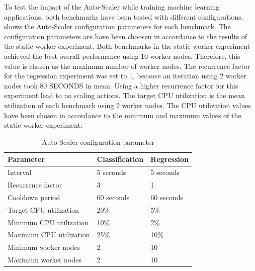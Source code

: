 To test the impact of the Auto-Scaler while training machine learning applications, both benchmarks have been tested with different configurations.  shows the Auto-Scaler configuration parameters for each benchmark.
The configuration parameters are have been choosen in accordance to the results of the static worker experiment.
Both benchmarks in the static worker experiment achieved the best overall performance using 10 worker nodes. Therefore, this value is chosen as the maximum number of worker nodes.
The recurrence factor for the regression experiment was set to 1, because an iteration using 2 worker nodes took 80 SECONDS in mean. Using a higher recurrence factor for this experiment lead to no scaling actions. The target CPU utilization is the mean utilization of each benchmark using 2 worker nodes.
The CPU utilization values have been chosen in accordance to the minimum and maximum values of the static worker experiment.
\begin{table}[]
\centering
\begin{tabular}{@{}l|ll@{}}
\toprule
Parameter               & Classification & Regression \\ \midrule
Interval                & 5 seconds      & 5 seconds  \\
Recurrence factor       & 3              & 1          \\
Cooldown period         & 60 seconds     & 60 seconds \\
Target CPU utilization  & 20\%           & 5\%        \\
Minimum CPU utilization & 10\%           & 2\%       \\
Maximum CPU utilization & 25\%           & 10\%       \\
Minimum worker nodes    & 2              & 10         \\
Maximum worker nodes    & 2              & 10         \\ \bottomrule
\end{tabular}
\caption{Auto-Scaler configuration parameter}
\label{table:07_auto-scaler_config_parameter}
\end{table}


